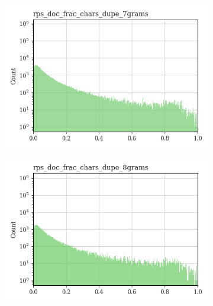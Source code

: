 \documentclass{article}
\begin{document}
\begin{figure}
\begin{subfigure}[b]{0.32\textwidth}
     \end{subfigure}
     \hfill
     \begin{subfigure}[b]{0.32\textwidth}
         \centering
         \includegraphics[width=\textwidth]{figures/quality_signals/rps_doc_frac_chars_dupe_7grams.png}
     \end{subfigure}
     \begin{subfigure}[b]{0.32\textwidth}
         \centering
         \includegraphics[width=\textwidth]{figures/quality_signals/rps_doc_frac_chars_dupe_8grams.png}
     \end{subfigure}
     \hfill
     \begin{subfigure}[b]{0.32\textwidth}
         \centering

\end{subfigure}
\end{figure}
\end{document}
